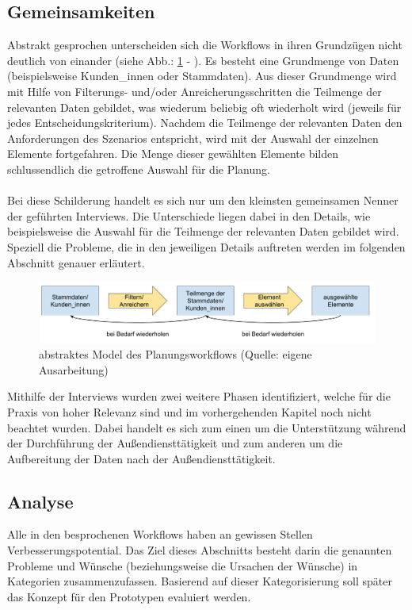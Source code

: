 \documentclass[Bachelorarbeit.tex]{subfiles}
\begin{document}
\subsection*{Gemeinsamkeiten}
\label{subsubsec:Ergebnisse der Interviews:gemeinsamkeiten}
Abstrakt gesprochen unterscheiden sich die Workflows in ihren Grundzügen nicht deutlich von einander (siehe Abb.: \ref{fig:abstrakterWorkflowPlannung} - ). 
Es besteht eine Grundmenge von Daten (beispielsweise Kunden\_innen oder Stammdaten). 
Aus dieser Grundmenge wird mit Hilfe von Filterungs- und/oder Anreicherungsschritten die Teilmenge der relevanten Daten gebildet, was wiederum beliebig oft wiederholt wird (jeweils für jedes Entscheidungskriterium).
Nachdem die Teilmenge der relevanten Daten den Anforderungen des Szenarios entspricht, wird mit der Auswahl der einzelnen Elemente fortgefahren.
Die Menge dieser gewählten Elemente bilden schlussendlich die getroffene Auswahl für die Planung.\\
\\
Bei diese Schilderung handelt es sich nur um den kleinsten gemeinsamen Nenner der geführten Interviews.
Die Unterschiede liegen dabei in den Details, wie beispielsweise die Auswahl für die Teilmenge der relevanten Daten gebildet wird.
Speziell die Probleme, die in den jeweiligen Details auftreten werden im folgenden Abschnitt genauer erläutert.

\begin{figure}[h]
	\includegraphics[width=\linewidth]{img/analyse/abstrakterWorkflowPlannung}
	\caption[abstrakter Planungsworkflow]{abstraktes Model des Planungsworkflows (Quelle: eigene Ausarbeitung)}
	\label{fig:abstrakterWorkflowPlannung}
\end{figure}

Mithilfe der Interviews wurden zwei weitere Phasen identifiziert, welche für die Praxis von hoher Relevanz sind und im vorhergehenden Kapitel noch nicht beachtet wurden.
Dabei handelt es sich zum einen um die Unterstützung während der Durchführung der Außendiensttätigkeit und zum anderen um die Aufbereitung der Daten nach der Außendiensttätigkeit.

\subsection*{Analyse}
\label{AnalyseInterviews}
Alle in den  besprochenen Workflows haben an gewissen Stellen Verbesserungspotential. 
Das Ziel dieses Abschnitts besteht darin die genannten Probleme und Wünsche (beziehungsweise die Ursachen der Wünsche) in Kategorien zusammenzufassen.
Basierend auf dieser Kategorisierung soll später das Konzept für den Prototypen evaluiert werden.
\end{document}
